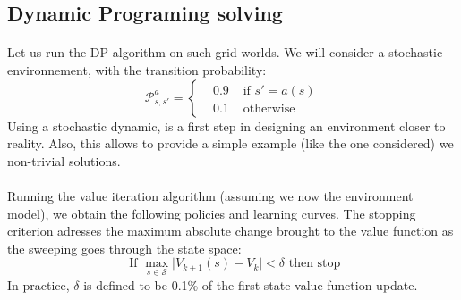 \documentclass[a4paper]{report}
\begin{document}
{{			\subsection{Dynamic Programing solving}
			{
				\paragraph{} Let us run the DP algorithm on such grid worlds. We will consider a stochastic environnement, with the transition probability: 
				\begin{equation}
					\mathcal{P}_{s,s'}^a = \left\{\begin{aligned} &0.9 &\text{ if }s' = a(s) \\ &0.1 &\text{ otherwise} \end{aligned}\right.
				\end{equation}
				Using a stochastic dynamic, is a first step in designing an environment closer to reality. Also, this allows to provide a simple example (like the one considered) we non-trivial solutions. 
				\paragraph{} Running the value iteration algorithm (assuming we now the environment model), we obtain the following policies and learning curves. The stopping criterion adresses the maximum absolute change brought to the value function as the sweeping goes through the state space: 
				\begin{equation}
					\text{ If } \max_{s\in\mathcal{S}} \vert V_{k+1}(s) - V_k \vert < \delta \text{ then stop}
				\end{equation}
				In practice, $\delta$ is defined to be 0.1\% of the first state-value function update. 
				
}}}
\end{document}
